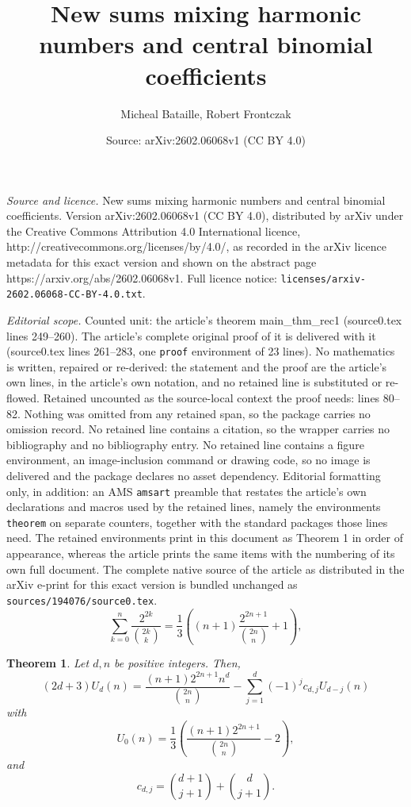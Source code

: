 \documentclass[10pt,a4paper]{amsart}
\title{New sums mixing harmonic numbers and central binomial coefficients}
\author{Micheal Bataille, Robert Frontczak}
\date{Source: arXiv:2602.06068v1 (CC BY 4.0)}
\newtheorem{theorem}{Theorem}
\begin{document}
\maketitle

\noindent\emph{Source and licence.} New sums mixing harmonic numbers and central binomial coefficients. Version arXiv:2602.06068v1 (CC BY 4.0), distributed by arXiv under the Creative Commons Attribution 4.0 International licence, http://creativecommons.org/licenses/by/4.0/, as recorded in the arXiv licence metadata for this exact version and shown on the abstract page https://arxiv.org/abs/2602.06068v1. Full licence notice: \texttt{licenses/arxiv-2602.06068-CC-BY-4.0.txt}.\par\smallskip

\noindent\textit{Editorial scope.} Counted unit: the article's theorem main\_thm\_rec1 (source0.tex lines 249--260). The article's complete original proof of it is delivered with it (source0.tex lines 261--283, one \texttt{proof} environment of 23 lines). No mathematics is written, repaired or re-derived: the statement and the proof are the article's own lines, in the article's own notation, and no retained line is substituted or re-flowed.  Retained uncounted as the source-local context the proof needs: lines 80--82.  Nothing was omitted from any retained span, so the package carries no omission record.  No retained line contains a citation, so the wrapper carries no bibliography and no bibliography entry.  No retained line contains a figure environment, an image-inclusion command or drawing code, so no image is delivered and the package declares no asset dependency.  Editorial formatting only, in addition: an AMS \texttt{amsart} preamble that restates the article's own declarations and macros used by the retained lines, namely the environments \texttt{theorem} on separate counters, together with the standard packages those lines need.  The retained environments print in this document as Theorem 1 in order of appearance, whereas the article prints the same items with the numbering of its own full document.  The complete native source of the article as distributed in the arXiv e-print for this exact version is bundled unchanged as \texttt{sources/194076/source0.tex}.
\begin{equation}\label{central_bin0}
\sum_{k=0}^n  \frac{2^{2k}}{\binom{2k}{k}} = \frac{1}{3}\left ( (n+1)\frac{2^{2n+1}}{\binom{2n}{n}} + 1 \right ),
\end{equation}

\begin{theorem}\label{main_thm_rec1} 
Let $d,n$ be positive integers. Then, 
\begin{equation}
(2d+3)U_d(n) = \frac{(n+1)2^{2n+1}n^d}{\binom{2n}{n}} - \sum_{j=1}^d (-1)^j c_{d,j} U_{d-j}(n)
\end{equation}
with
$$U_0(n) = \frac{1}{3}\left( \frac{(n+1)2^{2n+1}}{\binom{2n}{n}}-2\right),$$
and
\begin{equation}\label{c_term}
c_{d,j} = \binom{d+1}{j+1} + \binom{d}{j+1}.
\end{equation}
\end{theorem}
\end{document}
